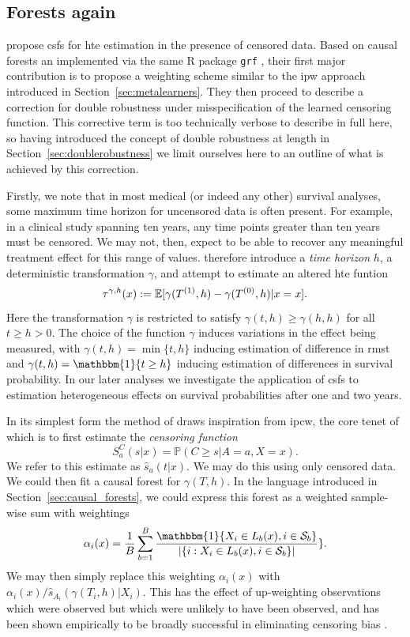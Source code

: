 \documentclass[../thesis.tex]{subfiles}
\begin{document}
\subsection{Forests again \label{sec:surv_hte_forests}}
\citet{cui_estimating_2022} propose \glspl{csf} for \gls{hte} estimation in the presence of censored data. Based on causal forests an implemented via the same R package \texttt{grf} \citep{tibshirani_grf_2023}, their first major contribution is to propose a weighting scheme similar to the \gls{ipw} approach introduced in Section~\ref{sec:metalearners}. They then proceed to describe a correction for double robustness under misspecification of the learned censoring function. This corrective term is too technically verbose to describe in full here, so having introduced the concept of double robustness at length in Section~\ref{sec:doublerobustness} we limit ourselves here to an outline of what is achieved by this correction.

Firstly, we note that in most medical (or indeed any other) survival analyses, some maximum time horizon for uncensored data is often present. For example, in a clinical study spanning ten years, any time points greater than ten years must be censored. We may not, then, expect to be able to recover any meaningful treatment effect for this range of values. \citet{cui_estimating_2022} therefore introduce a \emph{time horizon} $h$, a deterministic transformation $\gamma$, and attempt to estimate an altered \gls{hte} funtion
\[\tau^{\gamma, h}(x) := \mathbb{E}[\gamma(T^{(1)}, h) - \gamma(T^{(0)}, h) | x = x].\]
Here the transformation $\gamma$ is restricted to satisfy $\gamma(t, h) \geq \gamma(h, h)$ for all $t \geq h>0$. The choice of the function $\gamma$ induces variations in the effect being measured, with $\gamma(t,h) = \min\{t,h\}$ inducing estimation of difference in \gls{rmst} and $\gamma(t,h) = \mathbbm{1}\{t \geq h \}$ inducing estimation of differences in survival probability. In our later analyses we investigate the application of \glspl{csf} to estimation heterogeneous effects on survival probabilities after one and two years.

In its simplest form the method of \citet{cui_estimating_2022} draws inspiration from \gls{ipcw}, the core tenet of which is to first estimate the \emph{censoring function} 
\[S_a^C(s|x) = \mathbb{P}(C \geq s | A = a, X = x).\]
We refer to this estimate as $\hat{s}_a(t|x)$. We may do this using only censored data. We could then fit a causal forest for $\gamma(T, h)$. In the language introduced in Section~\ref{sec:causal_forests}, we could express this forest as a weighted sample-wise sum with weightings 
\[\alpha_i(x)  = \frac{1}{B}\sum_{b=1}^B\frac{\mathbbm{1}\{X_i \in L_b(x), i \in \mathcal{S}_b\}}{|\{i: X_i \in L_b(x), i \in \mathcal{S}_b\}|}\}.\]
We may then simply replace this weighting $\alpha_i(x)$ with $\alpha_i(x)/ \hat{s}_{A_i}(\gamma(T_i, h) | X_i)$. This has the effect of up-weighting observations which were observed but which were unlikely to have been observed, and has been shown empirically to be broadly successful in eliminating censoring bias \citep{van_der_laan_unified_2003}.
\end{document}
